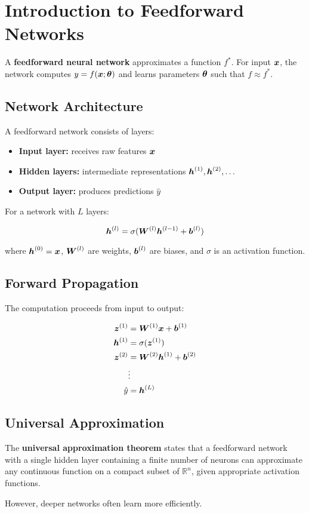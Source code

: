
\section{Introduction to Feedforward Networks}
\label{sec:intro-feedforward}

A \textbf{feedforward neural network} approximates a function $f^*$. For input $\boldsymbol{x}$, the network computes $y = f(\boldsymbol{x}; \boldsymbol{\theta})$ and learns parameters $\boldsymbol{\theta}$ such that $f \approx f^*$.

\subsection{Network Architecture}

A feedforward network consists of layers:
\begin{itemize}
    \item \textbf{Input layer:} receives raw features $\boldsymbol{x}$
    \item \textbf{Hidden layers:} intermediate representations $\boldsymbol{h}^{(1)}, \boldsymbol{h}^{(2)}, \ldots$
    \item \textbf{Output layer:} produces predictions $\hat{y}$
\end{itemize}

For a network with $L$ layers:

\begin{equation}
\boldsymbol{h}^{(l)} = \sigma(\boldsymbol{W}^{(l)} \boldsymbol{h}^{(l-1)} + \boldsymbol{b}^{(l)})
\end{equation}

where $\boldsymbol{h}^{(0)} = \boldsymbol{x}$, $\boldsymbol{W}^{(l)}$ are weights, $\boldsymbol{b}^{(l)}$ are biases, and $\sigma$ is an activation function.

\subsection{Forward Propagation}

The computation proceeds from input to output:

\begin{align}
\boldsymbol{z}^{(1)} &= \boldsymbol{W}^{(1)} \boldsymbol{x} + \boldsymbol{b}^{(1)} \\
\boldsymbol{h}^{(1)} &= \sigma(\boldsymbol{z}^{(1)}) \\
\boldsymbol{z}^{(2)} &= \boldsymbol{W}^{(2)} \boldsymbol{h}^{(1)} + \boldsymbol{b}^{(2)} \\
&\vdots \\
\hat{y} &= \boldsymbol{h}^{(L)}
\end{align}

\subsection{Universal Approximation}

The \textbf{universal approximation theorem} states that a feedforward network with a single hidden layer containing a finite number of neurons can approximate any continuous function on a compact subset of $\mathbb{R}^n$, given appropriate activation functions.

However, deeper networks often learn more efficiently.

